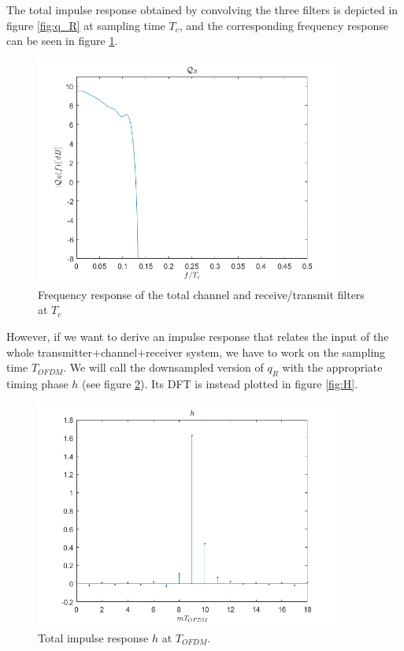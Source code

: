 \documentclass[a4paper,11.5pt]{article}
\begin{document}
The total impulse response obtained by convolving the three filters is depicted in figure \ref{fig:q_R} at sampling time $T_c$, and the corresponding frequency response can be seen in figure \ref{fig:Qmag_R}.

\begin{figure}[H]
	\begin{center}   
		\includegraphics[width=10cm]{figs/Qmag_R.png} 
		\caption{Frequency response of the total channel and receive/transmit filters at $T_c$}
		\label{fig:Qmag_R}
	\end{center}
\end{figure}

However, if we want to derive an impulse response that relates the input of the whole transmitter+channel+receiver system, we have to work on the sampling time $T_{OFDM}$. We will call the downsampled version of $q_R$ with the appropriate timing phase $h$ (see figure \ref{fig:h}). Its DFT is instead plotted in figure \ref{fig:H}. 

\begin{figure}[H]
	\begin{center}   
		\includegraphics[width=10cm]{figs/h.png} 
		\caption{Total impulse response $h$ at $T_{OFDM}$.}
		\label{fig:h}
	\end{center}
\end{figure}
\end{document}
